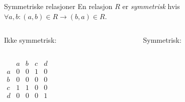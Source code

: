 \begin{frame}[fragile]{Symmetriske relasjoner}
    En relasjon $R$ er \emph{symmetrisk} hvis $\forall a, b : (a, b) \in R \rightarrow (b, a) \in R$.\\
    \begin{columns}
        \begin{column}{0.3\textwidth}
            Ikke symmetrisk:\\
        \end{column}
        \pause
        \begin{column}{0.3\textwidth}
            Symmetrisk:\\
        \end{column}
    \end{columns}
    \pause
    \begin{columns}
        \begin{column}{0.3\textwidth}
            \begin{math}
                \begin{matrix}
                      & a & b & c & d\\
                    a & 0 & 0 & 1 & 0\\
                    b & 0 & 0 & 0 & 0\\
                    c & 1 & 1 & 0 & 0\\
                    d & 0 & 0 & 0 & 1
                \end{matrix}
            \end{math}
        \end{column}
        \begin{column}{0.3\textwidth}
            \begin{math}

\end{math}
\end{column}
\end{columns}
\end{frame}
